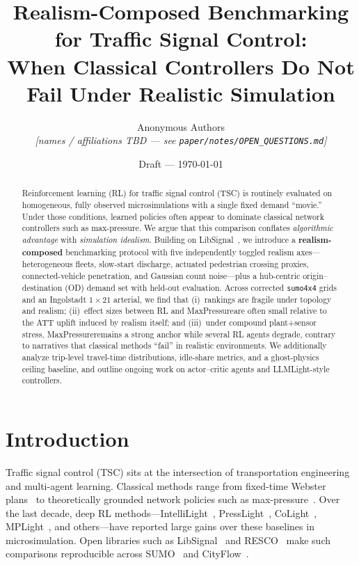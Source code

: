 \documentclass[11pt,a4paper]{article}
\title{%
  Realism-Composed Benchmarking for Traffic Signal Control:\\
  When Classical Controllers Do Not Fail Under Realistic Simulation
}
\author{%
  Anonymous Authors\\
  \small\textit{[names / affiliations TBD --- see \texttt{paper/notes/OPEN\_QUESTIONS.md}]}
}
\date{Draft --- \today}
\newcommand{\mpol}{MaxPressure}
\begin{document}
\maketitle

\begin{abstract}
Reinforcement learning (RL) for traffic signal control (TSC) is routinely evaluated on homogeneous, fully observed microsimulations with a single fixed demand ``movie.''
Under those conditions, learned policies often appear to dominate classical network controllers such as max-pressure.
We argue that this comparison conflates \emph{algorithmic advantage} with \emph{simulation idealism}.
Building on LibSignal~\citep{mei2023libsignal}, we introduce a \textbf{realism-composed} benchmarking protocol with five independently toggled realism axes---heterogeneous fleets, slow-start discharge, actuated pedestrian crossing proxies, connected-vehicle penetration, and Gaussian count noise---plus a hub-centric origin--destination (OD) demand set with held-out evaluation.
Across corrected \texttt{sumo4x4} grids and an Ingolstadt $1{\times}21$ arterial, we find that (i)~rankings are fragile under topology and realism; (ii)~effect sizes between RL and \mpol are often small relative to the ATT uplift induced by realism itself; and (iii)~under compound plant+sensor stress, \mpol remains a strong anchor while several RL agents degrade, contrary to narratives that classical methods ``fail'' in realistic environments.
We additionally analyze trip-level travel-time distributions, idle-share metrics, and a ghost-physics ceiling baseline, and outline ongoing work on actor--critic agents and LLMLight-style controllers.
\end{abstract}

\tableofcontents
\newpage

\section{Introduction}
\label{sec:intro}

Traffic signal control (TSC) sits at the intersection of transportation engineering and multi-agent learning.
Classical methods range from fixed-time Webster plans~\citep{webster1958} to theoretically grounded network policies such as max-pressure~\citep{varaiya2013maxpressure}.
Over the last decade, deep RL methods---IntelliLight~\citep{wei2018intellilight}, PressLight~\citep{wei2019presslight}, CoLight~\citep{wei2019colight}, MPLight~\citep{chen2020mplight}, and others---have reported large gains over these baselines in microsimulation.
Open libraries such as LibSignal~\citep{mei2023libsignal} and RESCO~\citep{ault2021resco} make such comparisons reproducible across SUMO~\citep{lopez2018sumo} and CityFlow~\citep{zhang2019cityflow}.
\end{document}
